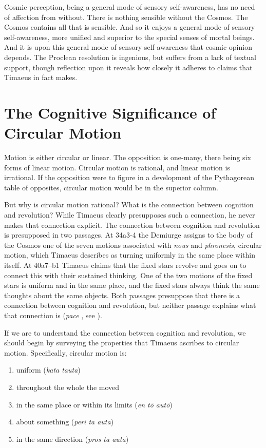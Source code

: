 Cosmic perception, being a general mode of sensory self-awareness, has no need of affection from without. There is nothing sensible without the Cosmos. The Cosmos contains all that is sensible. And so it enjoys a general mode of sensory self-awareness, more unified and superior to the special senses of mortal beings. And it is upon this general mode of sensory self-awareness that cosmic opinion depends. The Proclean resolution is ingenious, but suffers from a lack of textual support, though reflection upon it reveals how closely it adheres to claims that Timaeus in fact makes.


\section{The Cognitive Significance of Circular Motion} %
\label{sec:the_cognitive_significance_of_circular_motion}

Motion is either circular or linear. The opposition is one-many, there being six forms of linear motion. Circular motion is rational, and linear motion is irrational. If the opposition were to figure in a development of the Pythagorean table of opposites, circular motion would be in the superior column. 

But why is circular motion rational? What is the connection between cognition and revolution? While Timaeus clearly presupposes such a connection, he never makes that connection explicit. The connection between cognition and revolution is presupposed in two passages. At 34a3-4 the Demiurge assigns to the body of the Cosmos one of the seven motions associated with \emph{nous} and \emph{phronesis}, circular motion, which Timaeus describes as turning uniformly in the same place within itself. At 40a7--b1 Timaeus claims that the fixed stars revolve and goes on to connect this with their sustained thinking. One of the two motions of the fixed stars is uniform and in the same place, and the fixed stars always think the same thoughts about the same objects. Both passages presuppose that there is a connection between cognition and revolution, but neither passage explains what that connection is (\emph{pace} \citealt[119]{Cornford:1935fk}, see \citealt[72--3]{Lee:1976xs}).

If we are to understand the connection between cognition and revolution, we should begin by surveying the properties that Timaeus ascribes to circular motion. Specifically, circular motion is:
\begin{enumerate}[(1)]
	\item uniform (\emph{kata tauta})
	\item throughout the whole the moved
	\item in the same place or within its limits (\emph{en tō autō})
	\item about something (\emph{peri ta auta})
	\item in the same direction (\emph{pros ta auta})
\end{enumerate}

